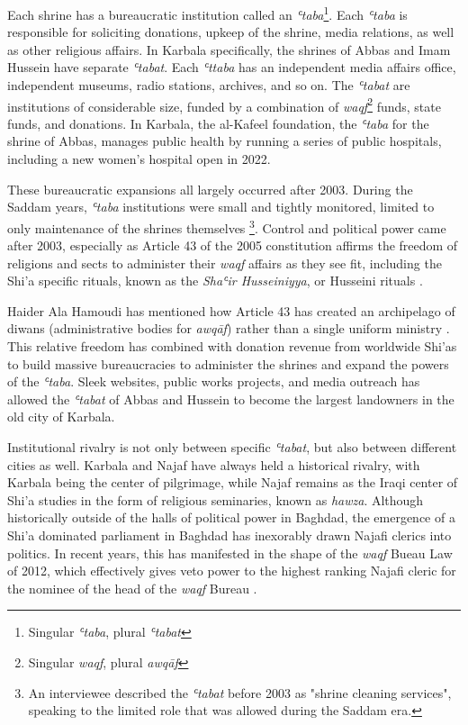 Each shrine has a bureaucratic institution called an \emph{ʿtaba}\footnote{Singular \emph{ʿtaba}, plural \emph{ʿtabat}}. Each \emph{ʿtaba} is responsible for soliciting donations, upkeep of the shrine, media relations, as well as other religious affairs. In Karbala specifically, the shrines of Abbas and Imam Hussein have separate \emph{ʿtabat}. Each \emph{ʿttaba} has an independent media affairs office, independent museums, radio stations, archives, and so on. The \emph{ʿtabat} are institutions of considerable size, funded by a combination of \emph{waqf}\footnote{Singular \emph{waqf}, plural \emph{awqāf}} funds, state funds, and donations. In Karbala, the al-Kafeel foundation, the \emph{ʿtaba} for the shrine of Abbas, manages public health by running a series of public hospitals, including a new women's hospital open in 2022. 

These bureaucratic expansions all largely occurred after 2003. During the Saddam years, \emph{ʿtaba} institutions were small and tightly monitored, limited to only maintenance of the shrines themselves \footnote{An interviewee described the \emph{ʿtabat} before 2003 as "shrine cleaning services", speaking to the limited role that was allowed during the Saddam era.}. Control and political power came after 2003, especially as Article 43 of the 2005 constitution affirms the freedom of religions and sects to administer their \emph{waqf} affairs as they see fit, including the Shi'a specific rituals, known as the \emph{Shaʿir Husseiniyya}, or Husseini rituals \cite{jawad_iraqi_2003}. 

Haider Ala Hamoudi has mentioned how Article 43 has created an archipelago of diwans (administrative bodies for \emph{awqāf}) rather than a single uniform ministry \cite[220]{hamoudi_engagements_2020}. This relative freedom has combined with donation revenue from worldwide Shi'as to build massive bureaucracies to administer the shrines and expand the powers of the \emph{ʿtaba}. Sleek websites, public works projects, and media outreach has allowed the \emph{ʿtabat} of Abbas and Hussein to become the largest landowners in the old city of Karbala. 

Institutional rivalry is not only between specific \emph{ʿtabat}, but also between different cities as well. Karbala and Najaf have always held a historical rivalry, with Karbala being the center of pilgrimage, while Najaf remains as the Iraqi center of Shi'a studies in the form of religious seminaries, known as \emph{hawza}. Although historically outside of the halls of political power in Baghdad, the emergence of a Shi'a dominated parliament in Baghdad has inexorably drawn Najafi clerics into politics. In recent years, this has manifested in the shape of the \emph{waqf} Bueau Law of 2012, which effectively gives veto power to the highest ranking Najafi cleric for the nominee of the head of the \emph{waqf} Bureau \cite{hamoudi_engagements_2020}.

